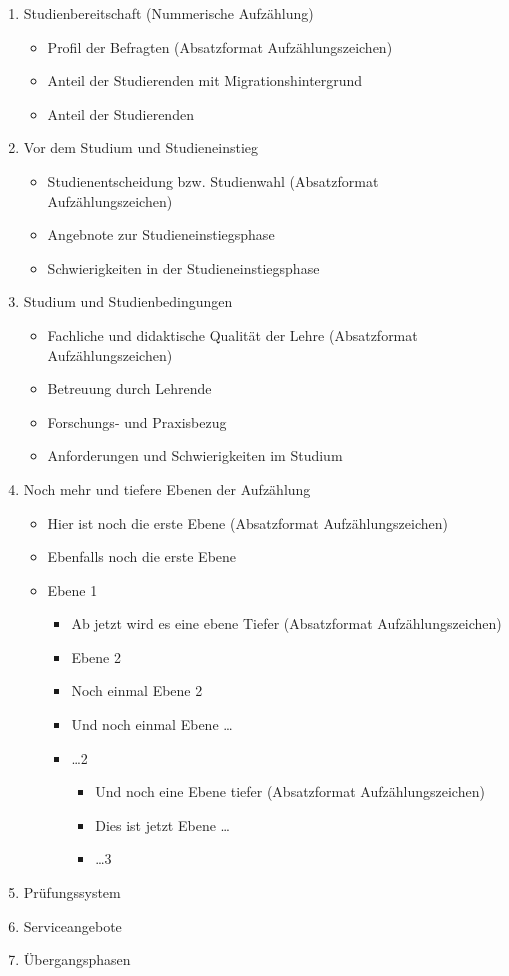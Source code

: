 \begin{enumerate}
\item Studienbereitschaft (Nummerische Aufzählung)

\begin{itemize}
\item Profil der Befragten (Absatzformat Aufzählungszeichen)
\item Anteil der Studierenden mit Migrationshintergrund
\item Anteil der Studierenden
\end{itemize}

\item Vor dem Studium und Studieneinstieg
\begin{itemize}
\item Studienentscheidung bzw. Studienwahl (Absatzformat Aufzählungszeichen)
\item Angebnote zur Studieneinstiegsphase
\item Schwierigkeiten in der Studieneinstiegsphase
\end{itemize}

\item Studium und Studienbedingungen
\begin{itemize}
\item Fachliche und didaktische Qualität der Lehre (Absatzformat Aufzählungszeichen)
\item Betreuung durch Lehrende
\item Forschungs- und Praxisbezug
\item Anforderungen und Schwierigkeiten im Studium
\end{itemize}

\item Noch mehr und tiefere Ebenen der Aufzählung

\begin{itemize}
\item Hier ist noch die erste Ebene (Absatzformat Aufzählungszeichen)
\item Ebenfalls noch die erste Ebene
\item Ebene 1
\begin{itemize}
\item Ab jetzt wird es eine ebene Tiefer (Absatzformat Aufzählungszeichen)
\item Ebene 2
\item Noch einmal Ebene 2
\item Und noch einmal Ebene \ldots
\item \ldots 2
\begin{itemize}
\item Und noch eine Ebene tiefer (Absatzformat Aufzählungszeichen)
\item Dies ist jetzt Ebene \ldots
\item \ldots 3
\end{itemize}
\end{itemize}
\end{itemize}

\item Prüfungssystem
\item Serviceangebote
\item Übergangsphasen

\end{enumerate}
